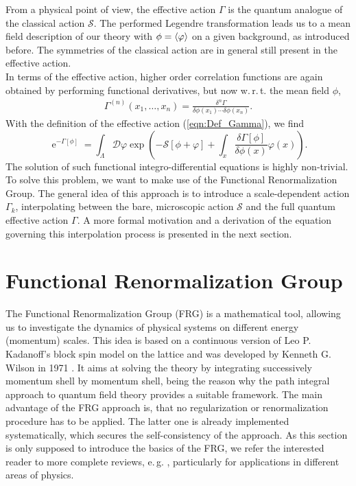 From a physical point of view, the effective action $\Gamma$ is the quantum analogue of the classical action $\mathcal{S}$. The performed Legendre transformation leads us to a mean field description of our theory with $\phi = \langle \varphi \rangle$ on a given background, as introduced before. The symmetries of the classical action are in general still present in the effective action.\\
In terms of the effective action, higher order correlation functions are again obtained by performing functional derivatives, but now w.\,r.\,t. the mean field $\phi$,
\begin{align}
	\Gamma^{(n)}\left(x_{1}, \ldots, x_{n}\right)=\frac{\delta^{n} \Gamma}{\delta \phi\left(x_{1}\right) \cdots \delta \phi\left(x_{n}\right)}.
\end{align}
With the definition of the effective action (\ref{eqn:Def_Gamma}), we find
\begin{equation}
	\operatorname{e}^{-\Gamma[\phi]}=\int_{\Lambda} \mathcal{D} \varphi \exp \left(-\mathcal{S}[\phi+\varphi]+\int_x \frac{\delta \Gamma[\phi]}{\delta \phi(x)} \varphi(x)\right).
\end{equation}  
The solution of such functional integro-differential equations is highly non-trivial. To solve this problem, we want to make use of the Functional Renormalization Group. The general idea of this approach is to introduce a scale-dependent action $\Gamma_k$, interpolating between the bare, microscopic action $\mathcal{S}$ and the full quantum effective action $\Gamma$. A more formal motivation and a derivation of the equation governing this interpolation process is presented in the next section.   
 \section{Functional Renormalization Group}
The Functional Renormalization Group (FRG) is a mathematical tool, allowing us to investigate the dynamics of physical systems on different energy (momentum) scales. This idea is based on a continuous version of Leo P. Kadanoff's block spin model on the lattice \cite{Kadanoff1966} and was developed by Kenneth G. Wilson in 1971 \cite{Wilson1971}. It aims at solving the theory by integrating successively momentum shell by momentum shell, being the reason why the path integral approach to quantum field theory provides a suitable framework. The main advantage of the FRG approach is, that no regularization or renormalization procedure has to be applied. The latter one is already implemented systematically, which secures the self-consistency of the approach. As this section is only supposed to introduce the basics of the FRG, we refer the interested reader to more complete reviews, e.\,g. \cite{Pawlowski2005, Gies2006}, particularly for applications in different areas of physics.

